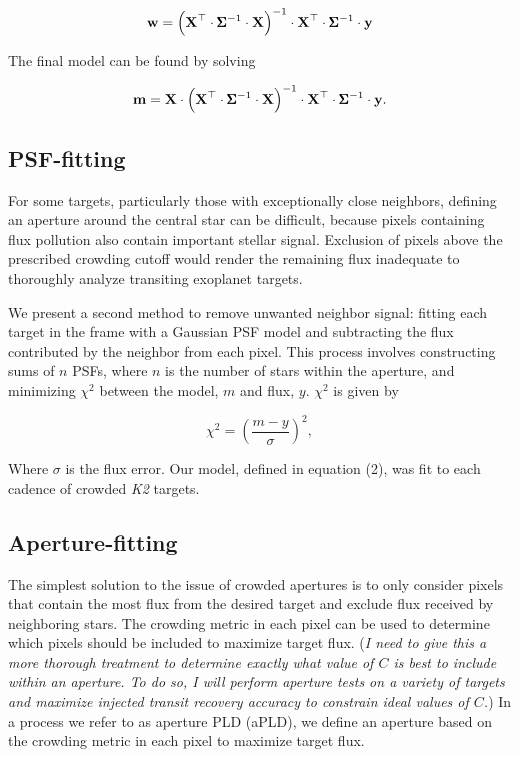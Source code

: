 \documentclass[12pt,preprint]{emulateapj}
\begin{document}
\[
\textbf{w} = \left( \textbf{X}^\top \cdot \pmb{\Sigma}^{-1} \cdot \textbf{X} \right)^{-1} \cdot \textbf{X}^\top \cdot \pmb{\Sigma}^{-1} \cdot \textbf{y} \\
\]

The final model can be found by solving

\[
\textbf{m} = \textbf{X} \cdot \left( \textbf{X}^\top \cdot \pmb{\Sigma}^{-1} \cdot \textbf{X} \right)^{-1} \cdot \textbf{X}^\top \cdot \pmb{\Sigma}^{-1} \cdot \textbf{y}. \\
\]

\subsection{PSF-fitting}

For some targets, particularly those with exceptionally close neighbors, defining an aperture around the central star can be difficult, because pixels containing flux pollution also contain important stellar signal. Exclusion of pixels above the prescribed crowding cutoff would render the remaining flux inadequate to thoroughly analyze transiting exoplanet targets.

We present a second method to remove unwanted neighbor signal: fitting each target in the frame with a Gaussian PSF model and subtracting the flux contributed by the neighbor from each pixel. This process involves constructing sums of $n$ PSFs, where $n$ is the number of stars within the aperture, and minimizing $\chi^2$ between the model, $m$ and flux, $y$. $\chi^2$ is given by

\[
\tag{5}
\chi^2 = \left( \frac{m-y}{\sigma} \right)^2,
\]

Where $\sigma$ is the flux error. Our model, defined in equation (2), was fit to each cadence of crowded \textit{K2} targets.

\subsection{Aperture-fitting}

The simplest solution to the issue of crowded apertures is to only consider pixels that contain the most flux from the desired target and exclude flux received by neighboring stars. The crowding metric in each pixel can be used to determine which pixels should be included to maximize target flux. (\textit{I need to give this a more thorough treatment to determine exactly what value of $C$ is best to include within an aperture. To do so, I will perform aperture tests on a variety of targets and maximize injected transit recovery accuracy to constrain ideal values of $C$.}) In a process we refer to as aperture PLD (aPLD), we define an aperture based on the crowding metric in each pixel to maximize target flux.
\end{document}
